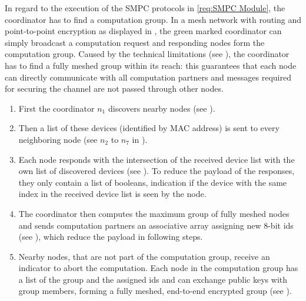 In regard to the execution of the \gls{SMPC} protocols in \ref{req:SMPC Module}, the coordinator has to find a computation group. In a mesh network with routing and point-to-point encryption as displayed in , the green marked coordinator can simply broadcast a computation request and responding nodes form the computation group. Caused by the technical limitations (see ), the coordinator has to find a fully meshed group within its reach: this guarantees that each node can directly communicate with all computation partners and messages required for securing the channel are not passed through other nodes. 
\begin{enumerate}
	\item First the coordinator $n_1$ discovers nearby nodes (see ).
	\item Then a list of these devices (identified by \gls{MAC} address) is sent to every neighboring node (see $n_2$ to $n_7$ in ).
	\item Each node responds with the intersection of the received device list with the own list of discovered devices (see ).  To reduce the payload of the responses, they only contain a list of booleans, indication if the device with the same index in the received device list is seen by the node.
	\item  The coordinator then computes the maximum group of fully meshed nodes and sends computation partners an associative array assigning new 8-bit ids (see ), which reduce the payload in following steps.
	\item  Nearby nodes, that are not part of the computation group, receive an indicator to abort the computation. Each node in the computation group has a list of the group and the assigned ids and can exchange public keys with group members, forming a fully meshed, end-to-end encrypted group (see ).
\end{enumerate}
  

